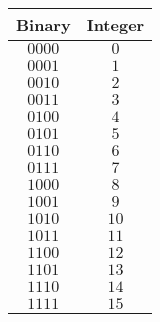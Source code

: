 \begin{tabular}{cc} \toprule
Binary & Integer \\\midrule
$0000$ & $0$     \\[4pt]
$0001$ & $1$     \\[4pt]
$0010$ & $2$     \\[4pt]
$0011$ & $3$     \\[4pt]
$0100$ & $4$     \\[4pt]
$0101$ & $5$     \\[4pt]
$0110$ & $6$     \\[4pt]
$0111$ & $7$     \\[4pt]
$1000$ & $8$     \\[4pt]
$1001$ & $9$     \\[4pt]
$1010$ & $10$    \\[4pt]
$1011$ & $11$    \\[4pt]
$1100$ & $12$    \\[4pt]
$1101$ & $13$    \\[4pt]
$1110$ & $14$    \\[4pt]
$1111$ & $15$    \\\bottomrule
\end{tabular}
